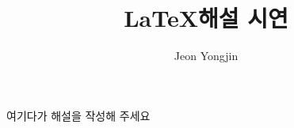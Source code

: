 \documentclass{article}
\author{Jeon Yongjin}
\title{\LaTeX 해설 시연}
\date{}
\begin{document}
\maketitle

여기다가 해설을 작성해 주세요
\end{document}
